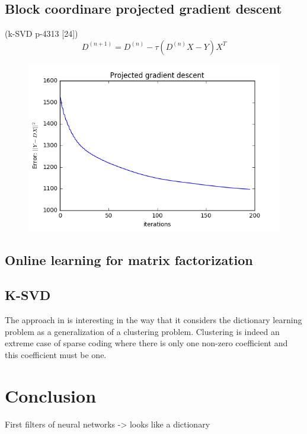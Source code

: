 \documentclass[a4paper,11pt]{article}
\begin{document}
\subsection{Block coordinare projected gradient descent}
\cite{olshausen97} (k-SVD p-4313 [24])
$$D^{(n+1)} = D^{(n)} - \tau (D^{(n)}X - Y) X^T$$
\begin{figure}[!htbp]
\centering
  \includegraphics[width=\linewidth]{projected_gradient_descent.png}
\end{figure}
\subsection{Online learning for matrix factorization}
\cite{mairal10}
\subsection{K-SVD}
The approach in \cite{aharon06} is interesting in the way that it considers the dictionary learning problem as a generalization of a clustering problem. Clustering is indeed an extreme case of sparse coding where there is only one non-zero coefficient and this coefficient must be one.

\section{Conclusion}
First filters of neural networks -> looks like a dictionary
\end{document}
